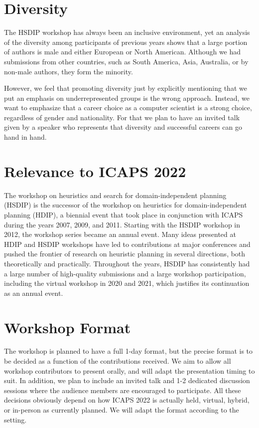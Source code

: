 \documentclass[10pt]{article}
\begin{document}
\section*{Diversity}
The HSDIP workshop has always been an inclusive environment, yet an analysis
of the diversity among participants of previous years shows that a large portion
of authors is male and either European or North American. Although we had
submissions from other countries, such as South America, Asia, Australia, or by
non-male authors, they form the minority.

However, we feel that promoting diversity just by explicitly mentioning that we
put an emphasis on underrepresented groups is the wrong approach. Instead, we
want to emphasize that a career choice as a computer scientist is a strong choice,
regardless of gender and nationality. For that we plan to have an invited talk
given by a speaker who represents that diversity and successful careers can go
hand in hand. 




\section*{Relevance to ICAPS 2022}

The workshop on heuristics and search for domain-independent planning (HSDIP) is
the successor of the workshop on heuristics for domain-independent planning
(HDIP), a biennial event that took place in conjunction with ICAPS during the
years 2007, 2009, and 2011. Starting with the HSDIP workshop in 2012, the
workshop series became an annual event.
Many ideas presented at HDIP and HSDIP workshops have led to contributions at major 
conferences and pushed the frontier of research on heuristic planning in several 
directions, both theoretically and practically. Throughout the years, HSDIP has 
consistently had a large number of high-quality submissions and a large workshop 
participation, including the virtual workshop in 2020 and 2021, which justifies its 
continuation as an annual event.

\section*{Workshop Format}

The workshop is planned to have a full 1-day format, but the precise format is
to be decided as a function of the contributions received.  We aim to allow all
workshop contributors to present orally, and will adapt the presentation timing
to suit. In addition, we plan to include an invited talk and 1-2 dedicated
discussion sessions where the audience members are encouraged to participate.
All these decisions obviously depend on how ICAPS 2022 is actually held,
virtual, hybrid, or in-person as currently planned. We will adapt the format
according to the setting.
\end{document}
